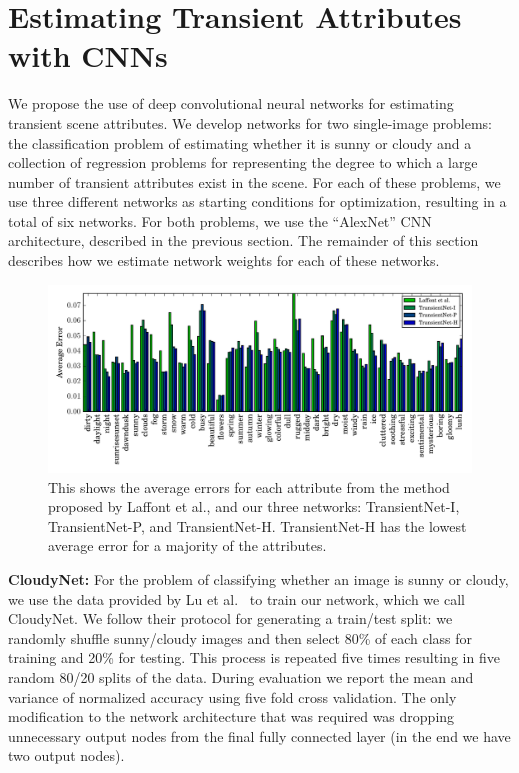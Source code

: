 \documentclass[10pt,twocolumn,letterpaper]{article}
\begin{document}
\section{Estimating Transient Attributes with CNNs}
We propose the use of deep convolutional neural networks for estimating transient
scene attributes. We develop networks for two single-image problems: the
classification problem of estimating whether it is sunny or cloudy and a
collection of regression problems for representing the degree to which a large
number of transient attributes exist in the scene.  For each of these problems,
we use three different networks as starting conditions for optimization,
resulting in a total of six networks.  For both problems, we use the
``AlexNet'' CNN architecture, described in the previous section.  The remainder
of this section describes how we estimate network weights for each of these
networks.

\begin{figure}[t!]
	\centering
		\includegraphics[width=1.0\textwidth, trim= 0 4mm 0 0]{figs/avg_err_compare.pdf}
		\caption{This shows the average errors for each attribute from the method proposed
						 by Laffont et al., and our three networks: TransientNet-I, TransientNet-P,
             and TransientNet-H.  TransientNet-H has the lowest average error for a 
             majority of the attributes.}
		\label{fig:compare}
\end{figure}

\textbf{CloudyNet:} For the problem of classifying whether an image is sunny or
cloudy, we use the data provided by Lu et al.~\cite{lutwoclass} to train our
network, which we call CloudyNet.  We follow their protocol for
generating a train/test split: we randomly shuffle sunny/cloudy images
and then select 80\% of each class for training and 20\% for testing.
This process is repeated five times resulting in five random 80/20
splits of the data. During evaluation we report the mean and variance
of normalized accuracy using five fold cross validation. The only
modification to the network architecture that was required was
dropping unnecessary output nodes from the final fully connected layer
(in the end we have two output nodes).
\end{document}
